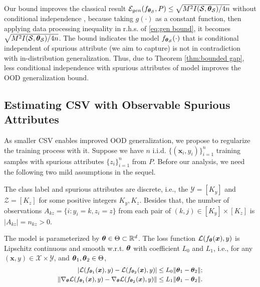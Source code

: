 \documentclass{article} %
\newcommand{\btheta}{\text{\boldmath{$\theta$}}}
\newcommand{\bx}{\boldsymbol{x}}
\newcommand{\bbR}{\mathbb{R}}
\newcommand{\cE}{\mathcal{E}}
\newcommand{\cX}{\mathcal{X}}
\newcommand{\cY}{\mathcal{Y}}
\newcommand{\cZ}{\mathcal{Z}}
\newcommand{\cL}{\mathcal{L}}
\newcommand{\cS}{\mathcal{S}}
\begin{document}
	Our bound improves the classical result $\cE_{gen}(f_{\btheta_{\cS}}, P)\leq \sqrt{M^{2}I(\cS, \btheta_{\cS})/4n}$ without conditional independence \citep{steinke2020reasoning}, because taking $g(\cdot)$ as a constant function, then applying data processing inequality \citep{xu2017information} in r.h.s. of \eqref{eq:gen bound}, it becomes $\sqrt{M^{2}I(\cS, \btheta_{\cS})/4n}$. The bound indicates the model $f_{\btheta_{\cS}}(\cdot)$ that is conditional independent of spurious attribute (we aim to capture) is not in contradiction with in-distribution generalization. Thus, due to Theorem \ref{thm:bounded gap}, less conditional independence with spurious attributes of model improves the OOD generalization bound.
	
	\subsection{Estimating CSV with Observable Spurious Attributes}\label{sec:estimators of CSV}
	As smaller CSV enables improved OOD generalization, we propose to regularize the training process with it. Suppose we have $n$ i.i.d. $\{(\bx_{i}, y_{i})\}_{i=1}^{n}$ training samples with spurious attributes $\{z_{i}\}_{i=1}^{n}$ from $P$. Before our analysis, we need the following two mild assumptions in the sequel. 
	\begin{assumption}\label{ass:feature space}
		The class label and spurious attributes are discrete, i.e., the $\cY = [K_{y}]$ and $\cZ = [K_{z}]$ for some positive integers $K_{y}, K_{z}$. Besides that, the number of observations $A_{kz} = \{i: y_{i}=k, z_{i}=z\}$ from each pair of $(k, j)\in[K_{y}]\times [K_{z}]$ is $|A_{kz}| = n_{kz} >0$.
	\end{assumption}
	\begin{assumption}\label{ass:Lip}
		The model is parameterized by $\btheta\in\Theta\subset\bbR^{d}$. The loss function $\cL(f_{\btheta}(\bx), y)$ is Lipschitz continuous and smooth w.r.t. $\btheta$ with coefficient $L_{0}$ and $L_{1}$, i.e., for any $(\bx, y)\in\cX\times\cY$, and $\btheta_{1}, \btheta_{2}\in\Theta$,
		\begin{equation}
			\small
			\begin{aligned}
				\left|\cL(f_{\btheta_{1}}(\bx), y) - \cL(f_{\btheta_{2}}(\bx), y)\right| \leq L_{0}\|\btheta_{1} - \btheta_{2}\|;\\
				\left\|\nabla_{\btheta}\cL(f_{\btheta_{1}}(\bx), y) - \nabla_{\btheta}\cL(f_{\btheta_{2}}(\bx), y)\right\| \leq L_{1}\|\btheta_{1} - \btheta_{2}\|.
			\end{aligned}
		\end{equation}
	\end{assumption}
\end{document}
